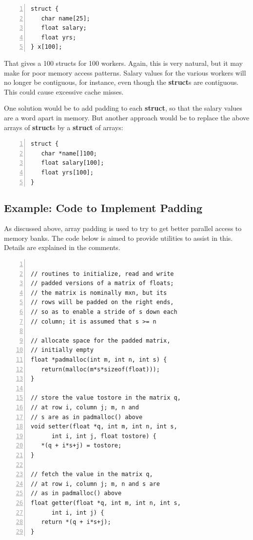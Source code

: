 \begin{lstlisting}[numbers=left]
struct {
   char name[25];
   float salary;
   float yrs;
} x[100];
\end{lstlisting}

That gives a 100 structs for 100 workers.  Again, this is very natural,
but it may make for poor memory access patterns.  Salary values for the
various workers will no longer be contiguous, for instance, even though
the {\bf struct}s are contiguous.  This could cause excessive cache
misses.

One solution would be to add padding to each {\bf struct}, so that the
salary values are a word apart in memory.  But another approach would be
to replace the above arrays of {\bf struct}s by a {\bf struct} of
arrays:

\begin{lstlisting}[numbers=left]
struct {
   char *name[]100;
   float salary[100];
   float yrs[100];
}
\end{lstlisting}

\subsection{Example:  Code to Implement Padding}

As discussed above, array padding is used to try to get better parallel
access to memory banks.  The code below is aimed to provide utilities to
assist in this.  Details are explained in the comments.

\begin{lstlisting}[numbers=left]

// routines to initialize, read and write
// padded versions of a matrix of floats;
// the matrix is nominally mxn, but its
// rows will be padded on the right ends,
// so as to enable a stride of s down each
// column; it is assumed that s >= n

// allocate space for the padded matrix,
// initially empty
float *padmalloc(int m, int n, int s) {
   return(malloc(m*s*sizeof(float)));
}

// store the value tostore in the matrix q,
// at row i, column j; m, n and
// s are as in padmalloc() above
void setter(float *q, int m, int n, int s,
      int i, int j, float tostore) {
   *(q + i*s+j) = tostore;
}

// fetch the value in the matrix q,
// at row i, column j; m, n and s are
// as in padmalloc() above
float getter(float *q, int m, int n, int s,
      int i, int j) {
   return *(q + i*s+j);
}
\end{lstlisting}


